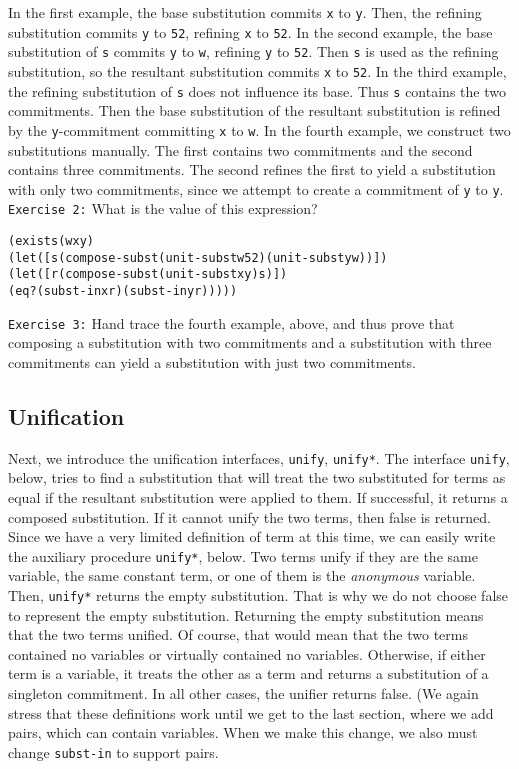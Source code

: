 In the first example, the base substitution commits \texttt{x} to
\texttt{y}.  Then, the refining substitution commits \texttt{y} to
\texttt{52}, refining \texttt{x} to \texttt{52}.  In the second
example, the base substitution of \texttt{s} commits \texttt{y} to
\texttt{w}, refining \texttt{y} to \texttt{52}.  Then \texttt{s} is
used as the refining substitution, so the resultant substitution
commits \texttt{x} to \texttt{52}.  In the third example, the refining
substitution of \texttt{s} does not influence its base.  Thus
\texttt{s} contains the two commitments.  Then the base substitution
of the resultant substitution is refined by the \texttt{y}-commitment committing
\texttt{x} to \texttt{w}.  In the fourth example, we construct two
substitutions manually.  The first contains two commitments and the
second contains three commitments.  The second refines the first to
yield a substitution with only two commitments, since we attempt to
create a commitment of \texttt{y} to \texttt{y}.
\newpage
\texttt{Exercise 2:} What is the value of this expression?
\begin{alltt}
(exists (w x y)
  (let ([s (compose-subst (unit-subst w 52) (unit-subst y w))])
    (let ([r (compose-subst (unit-subst x y) s)])
      (eq? (subst-in x r) (subst-in y r)))))
\end{alltt}

\texttt{Exercise 3:} Hand trace the fourth example, above, and
thus prove that composing a substitution with two commitments and
a substitution with three commitments can yield a substitution
with just two commitments.

\subsection{Unification}

Next, we introduce the unification interfaces, \texttt{unify},
\texttt{unify*}.  The interface \texttt{unify}, below, tries to find a
substitution that will treat the two substituted for terms as equal if
the resultant substitution were applied to them.  If successful, it
returns a composed substitution.  If it cannot unify the two terms,
then false is returned.  Since we have a very limited definition of
term at this time, we can easily write the auxiliary procedure
\texttt{unify*}, below.  Two terms unify if they are the same
variable, the same constant term, or one of them is the
\emph{anonymous} variable.  Then, \texttt{unify*} returns the empty
substitution.  That is why we do not choose false to represent the
empty substitution.  Returning the empty substitution means that the
two terms unified.  Of course, that would mean that the two terms
contained no variables or virtually contained no variables.
Otherwise, if either term is a variable, it treats the other as a term
and returns a substitution of a singleton commitment. In all other
cases, the unifier returns false.  (We again stress that these
definitions work until we get to the last section, where we add pairs,
which can contain variables.  When we make this change, we also must
change \texttt{subst-in} to support pairs.

